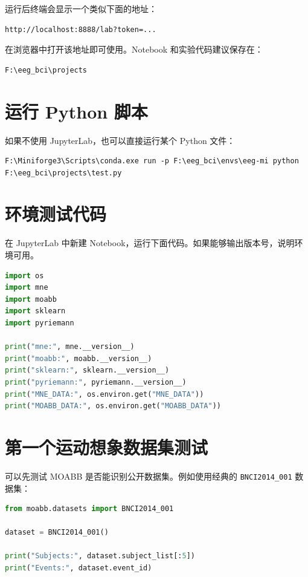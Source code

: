 \documentclass[UTF8,a4paper,12pt]{ctexart}
\begin{document}
运行后终端会显示一个类似下面的地址：

\begin{lstlisting}[language={}]
http://localhost:8888/lab?token=...
\end{lstlisting}

在浏览器中打开该地址即可使用。Notebook 和实验代码建议保存在：

\begin{lstlisting}[language={}]
F:\eeg_bci\projects
\end{lstlisting}

\section{运行 Python 脚本}

如果不使用 JupyterLab，也可以直接运行某个 Python 文件：

\begin{lstlisting}[language={},caption={运行 Python 文件}]
F:\Miniforge3\Scripts\conda.exe run -p F:\eeg_bci\envs\eeg-mi python F:\eeg_bci\projects\test.py
\end{lstlisting}

\section{环境测试代码}

在 JupyterLab 中新建 Notebook，运行下面代码。如果能够输出版本号，说明环境可用。

\begin{lstlisting}[language=Python,caption={验证核心软件包}]
import os
import mne
import moabb
import sklearn
import pyriemann

print("mne:", mne.__version__)
print("moabb:", moabb.__version__)
print("sklearn:", sklearn.__version__)
print("pyriemann:", pyriemann.__version__)
print("MNE_DATA:", os.environ.get("MNE_DATA"))
print("MOABB_DATA:", os.environ.get("MOABB_DATA"))
\end{lstlisting}

\section{第一个运动想象数据集测试}

可以先测试 MOABB 是否能识别公开数据集。例如使用经典的 \texttt{BNCI2014\_001} 数据集：

\begin{lstlisting}[language=Python,caption={查看公开运动想象数据集信息}]
from moabb.datasets import BNCI2014_001

dataset = BNCI2014_001()

print("Subjects:", dataset.subject_list[:5])
print("Events:", dataset.event_id)
\end{lstlisting}
\end{document}
